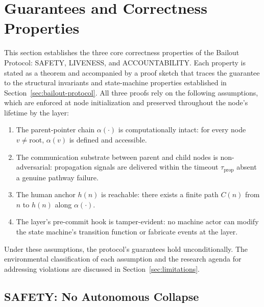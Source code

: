 \section{Guarantees and Correctness Properties}
\label{sec:guarantees}

This section establishes the three core correctness properties of the Bailout Protocol: SAFETY, LIVENESS, and ACCOUNTABILITY. Each property is stated as a theorem and accompanied by a proof sketch that traces the guarantee to the structural invariants and state-machine properties established in Section~\ref{sec:bailout-protocol}. All three proofs rely on the following assumptions, which are enforced at node initialization and preserved throughout the node's lifetime by the \fact{} layer:

\begin{assumptions}
\label{assumptions}
\begin{enumerate}\itemsep=0pt
\item[\textbf{(A1)}] The parent-pointer chain $\alpha(\cdot)$ is computationally intact: for every node $v \neq \text{root}$, $\alpha(v)$ is defined and accessible.
\item[\textbf{(A2)}] The communication substrate between parent and child nodes is non-adversarial: propagation signals are delivered within the timeout $\tau_{\text{prop}}$ absent a genuine pathway failure.
\item[\textbf{(A3)}] The human anchor $h(n)$ is reachable: there exists a finite path $C(n)$ from $n$ to $h(n)$ along $\alpha(\cdot)$.
\item[\textbf{(A4)}] The \fact{} layer's pre-commit hook is tamper-evident: no machine actor can modify the state machine's transition function or fabricate events at the \fact{} layer.
\end{enumerate}
\end{assumptions}

Under these assumptions, the protocol's guarantees hold unconditionally. The environmental classification of each assumption and the research agenda for addressing violations are discussed in Section~\ref{sec:limitations}.

\subsection{SAFETY: No Autonomous Collapse}
\label{sec:safety}

